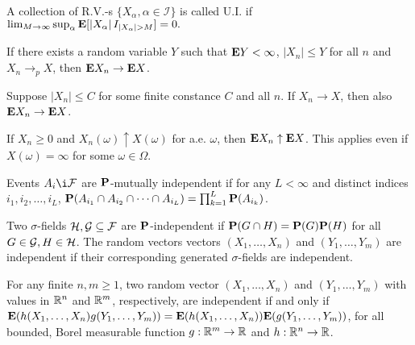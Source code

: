 \begin{definition*}
A collection of R.V.-s $\{X_\alpha,\alpha\in \mathcal I\}$ is called U.I. if $\lim_{M \to\infty} \sup_\alpha \mathbf{E}[\left\lvert X_\alpha \right\rvert I_{\left\lvert X_\alpha \right\rvert > M}] = 0.$
\end{definition*}

\begin{theorem*}
If there exists a random variable $Y$ such that $\mathbf{E} Y < \infty$, $|X_n| \le Y$
for all $n$ and $X_n \rightarrow_p X$, then $\mathbf{E} X_n \rightarrow \mathbf{E} X$.
\end{theorem*} 

\begin{corollary*}
Suppose $|X_n| \le C$ for some finite constance $C$ and all $n$. If $X_n
\rightarrow X$, then also $\mathbf{E} X_n \rightarrow \mathbf{E} X$.
\end{corollary*} 

\begin{theorem*}
If $X_n \ge 0$ and $X_n(\omega)\uparrow X(\omega)$ for a.e. $\omega$, then
$\mathbf{E} X_n \uparrow \mathbf{E} X$. This applies even if $X(\omega) = \infty$ for some
$\omega \in \Omega$.
\end{theorem*} 

\begin{definition*} 
Events $A_i \i \F$ are $\mathbf{P}$-mutually independent if for any $L < \infty$ and
distinct indices $i_1, i_2, \dots, i_L$,
$\mathbf{P}(A_{i_1} \cap A_{i_2} \cap \dots \cap A_{i_L}) = \prod_{k=1}^L
\mathbf{P}(A_{i_k})$.
\end{definition*} 

\begin{definition*} 
Two $\sigma$-fields $\mathcal{H}, \mathcal{G} \subseteq \mathcal{F}$ are $\mathbf{P}$-independent if $\mathbf{P}(G \cap
H) = \mathbf{P}(G) \mathbf{P}(H)$ for all $G \in \mathcal{G}, H \in \mathcal{H}$. The random vectors vectors
$(X_1, \dots, X_n)$ and $(Y_1, \dots, Y_m)$ are independent if their
corresponding generated $\sigma$-fields are independent.
\end{definition*} 

\begin{proposition*} 
For any finite $n, m \ge 1$, two random vector $(X_1, \dots, X_n)$ and $(Y_1,
\dots, Y_m)$ with values in $\mathbb{R}^n$ and $\mathbb{R}^m$, respectively, are independent if
and only if $\mathbf{E}(h(X_1, \dots, X_n) g(Y_1, \dots, Y_m))
= \mathbf{E}(h(X_1, \dots, X_n)) \mathbf{E}(g(Y_1, \dots, Y_m))$, for all bounded, Borel
measurable function $g: \mathbb{R}^m \rightarrow \mathbb{R}$ and $h: \mathbb{R}^n \rightarrow \mathbb{R}$.
\end{proposition*} 

